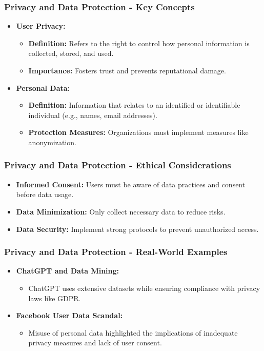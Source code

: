 \documentclass[aspectratio=169]{beamer}
\begin{document}
\begin{frame}[fragile]
    \frametitle{Privacy and Data Protection - Key Concepts}
    \begin{itemize}
        \item \textbf{User Privacy:}
        \begin{itemize}
            \item \textbf{Definition:} Refers to the right to control how personal information is collected, stored, and used.
            \item \textbf{Importance:} Fosters trust and prevents reputational damage.
        \end{itemize}
        
        \item \textbf{Personal Data:}
        \begin{itemize}
            \item \textbf{Definition:} Information that relates to an identified or identifiable individual (e.g., names, email addresses).
            \item \textbf{Protection Measures:} Organizations must implement measures like anonymization.
        \end{itemize}
    \end{itemize}
\end{frame}

\begin{frame}[fragile]
    \frametitle{Privacy and Data Protection - Ethical Considerations}
    \begin{itemize}
        \item \textbf{Informed Consent:} Users must be aware of data practices and consent before data usage.
        \item \textbf{Data Minimization:} Only collect necessary data to reduce risks.
        \item \textbf{Data Security:} Implement strong protocols to prevent unauthorized access.
    \end{itemize}
\end{frame}

\begin{frame}[fragile]
    \frametitle{Privacy and Data Protection - Real-World Examples}
    \begin{itemize}
        \item \textbf{ChatGPT and Data Mining:} 
        \begin{itemize}
            \item ChatGPT uses extensive datasets while ensuring compliance with privacy laws like GDPR.
        \end{itemize}
        
        \item \textbf{Facebook User Data Scandal:} 
        \begin{itemize}
            \item Misuse of personal data highlighted the implications of inadequate privacy measures and lack of user consent.
        \end{itemize}
    \end{itemize}
\end{frame}
\end{document}
